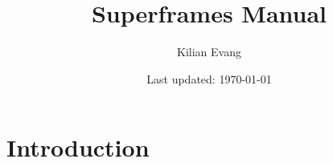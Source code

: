 \documentclass[a4paper]{article}
\title{Superframes Manual}
\author{Kilian Evang}
\date{Last updated: \today}
\begin{document}
\setlength{\Exindent}{0pt}
\setlength{\Exlabelsep}{0pt}
\setlength{\SubExleftmargin}{6pt}
\setlength{\SubSubExleftmargin}{6pt}

\maketitle



\newpage\tableofcontents


\newpage\section{Introduction}
\end{document}
